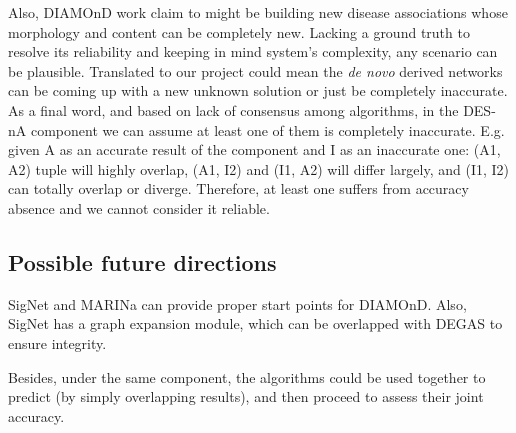 Also, DIAMOnD work claim to might be building new disease associations whose morphology and content can be completely new. Lacking a ground truth to resolve its reliability and keeping in mind system’s complexity, any scenario can be plausible. Translated to our project could mean the \textit{de novo} derived networks can be coming up with a new unknown solution or just be completely inaccurate. 
\\

As a final word, and based on lack of consensus among algorithms, in the DES-nA component we can assume at least one of them is completely inaccurate. E.g. given A as an accurate result of the component and I as an inaccurate one: (A1, A2) tuple will highly overlap, (A1, I2) and (I1, A2) will differ largely, and (I1, I2) can totally overlap or diverge. Therefore, at least one suffers from accuracy absence and we cannot consider it reliable.

\subsection{Possible future directions}
SigNet and MARINa can provide proper start points for DIAMOnD. Also, SigNet has a graph expansion module, which can be overlapped with DEGAS to ensure integrity.

Besides, under the same component, the algorithms could be used together to predict (by simply overlapping results), and then proceed to assess their joint accuracy.
